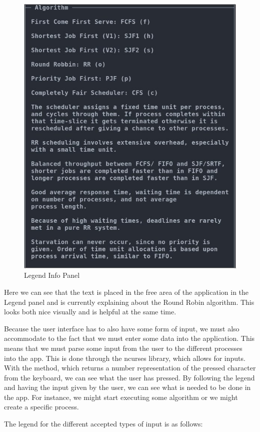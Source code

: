 \documentclass{article}
\newcommand{\code}[1]{\codeinline{\texttt{#1}}}
\begin{document}
\begin{itemize}
  \begin{figure}[H]
    \centering
    \includegraphics[width=0.65\columnwidth]{./pics/legenddata.jpg}
    \caption{Legend Info Panel}
    \label{fig:Legend Info Panel}
  \end{figure}

  Here we can see that the text is placed in the free area of the application in the Legend panel and is currently explaining about the Round Robin algorithm. This looks both nice visually and is helpful at the same time.

\end{itemize}

Because the user interface has to also have some form of input, we must also accommodate to the fact that we must enter some data into the application. This means that we must parse some input from the user to the different processes into the app. This is done through the ncurses library, which allows for inputs. With the \code{getch()} method, which returns a number representation of the pressed character from the keyboard, we can see what the user has pressed. By following the legend and having the input given by the user, we can see what is needed to be done in the app. For instance, we might start executing some algorithm or we might create a specific process.

The legend for the different accepted types of input is as follows:
\end{document}

